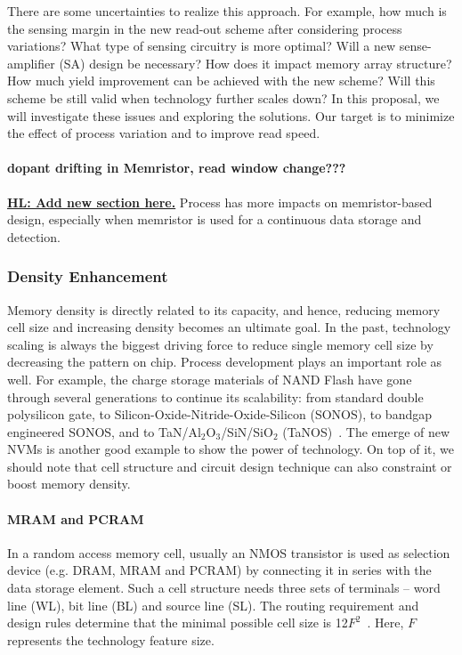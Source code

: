 There are some uncertainties to realize this approach. For example, how much is the sensing margin in the new read-out scheme after considering process variations? What type of sensing circuitry is more optimal? Will a new sense-amplifier (SA) design be necessary? How does it impact memory array structure? How much yield improvement can be achieved with the new scheme? Will this scheme be still valid when technology further scales down? In this proposal, we will investigate these issues and exploring the solutions. Our target is to minimize the effect of process variation and to improve read speed.

\paragraph{dopant drifting in Memristor, read window change???}
\textbf{\underline{HL: Add new section here.}}
Process has more impacts on memristor-based design, especially when memristor is used for a continuous data storage and detection.


\subsubsection{Density Enhancement}

Memory density is directly related to its capacity, and hence, reducing memory cell size and increasing density becomes an ultimate goal. In the past, technology scaling is always the biggest driving force to reduce single memory cell size by decreasing the pattern on chip. Process development plays an important role as well. For example, the charge storage materials of NAND Flash have gone through several generations to continue its scalability: from standard double polysilicon gate, to Silicon-Oxide-Nitride-Oxide-Silicon (SONOS), to bandgap engineered SONOS, and to TaN/Al$_2$O$_3$/SiN/SiO$_2$ (TaNOS)~\cite{Lu09}. The emerge of new NVMs is another good example to show the power of technology. On top of it, we should note that cell structure and circuit design technique can also constraint or boost memory density.

\paragraph{MRAM and PCRAM}

In a random access memory cell, usually an NMOS transistor is used as selection device (e.g. DRAM, MRAM and PCRAM) by connecting it in series with the data storage element. Such a cell structure needs three sets of terminals -- word line (WL), bit line (BL) and source line (SL). The routing requirement and design rules determine that the minimal possible cell size is 12$F^2$~\cite{Li09}. Here, $F$ represents the technology feature size.

